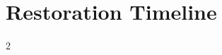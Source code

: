 \part{Restoration Timeline}
	\label{TIMELINE}
	
	{\scriptsize\TimelineLegend}
	
	\begin{multicols}{2}
		
		
		
	\end{multicols}





